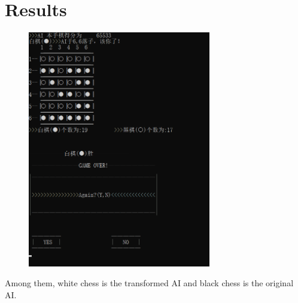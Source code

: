 \documentclass[a4paper, 11pt]{article}
\begin{document}
\section{Results}
\begin{figure}[!h]
    \centering
    \includegraphics[width=8cm]{Pic/result.bmp}

\end{figure}
Among them, white chess is the transformed AI and black chess is the original AI.
%
%
\end{document}
